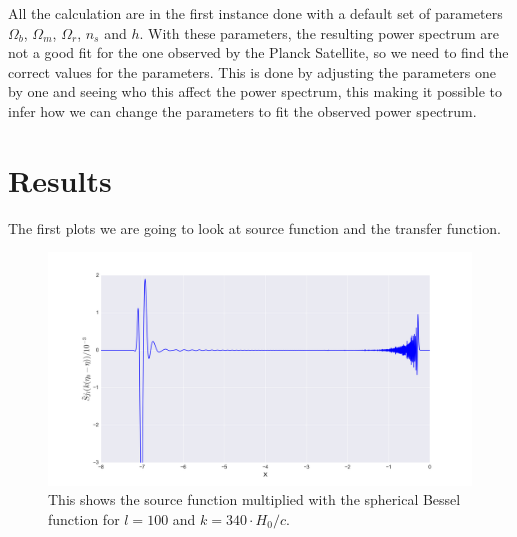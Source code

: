 \documentclass[a4paper,norsk, 10pt]{article}
\begin{document}
All the calculation are in the first instance done with a default set of parameters $\Omega_b$, $\Omega_m$, $\Omega_r$, $n_s$ and $h$. With these parameters, the resulting power spectrum are not a good fit for the one observed by the Planck Satellite, so we need to find the correct values for the parameters. This is done by adjusting the parameters one by one and seeing who this affect the power spectrum, this making it possible to infer how we can change the parameters to fit the observed power spectrum.


\section{Results}

The first plots we are going to look at source function and the transfer function. 


\begin{figure}
\centering
\includegraphics[scale=0.25]{sjl.png}
\caption{This shows the source function multiplied with the spherical Bessel function for $l=100$ and $k = 340\cdot H_0/c$.}\label{fig:sjl}
\end{figure}
\end{document}
